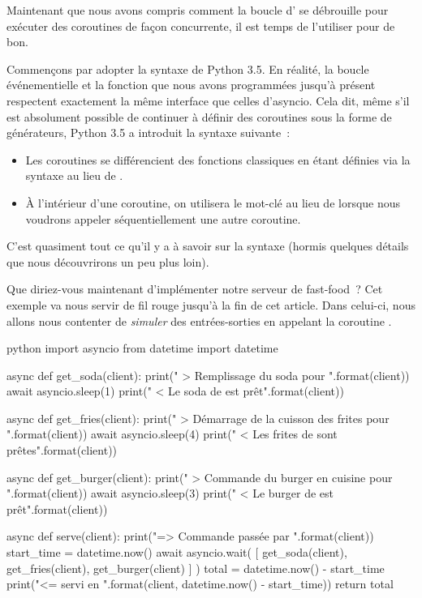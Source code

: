 \documentclass[small]{zmdocument}
\begin{document}

Maintenant que nous avons compris comment la boucle d' se débrouille pour exécuter des coroutines de façon concurrente, il est temps de l’utiliser pour de bon.



Commençons par adopter la syntaxe de Python 3.5. En réalité, la boucle événementielle et la fonction  que nous avons programmées jusqu’à présent respectent exactement la même interface que celles d’asyncio. Cela dit, même s’il est absolument possible de continuer à définir des coroutines sous la forme de générateurs, Python 3.5 a introduit la syntaxe suivante :



\begin{itemize}
\item\relax Les coroutines se différencient des fonctions classiques en étant définies via la syntaxe  au lieu de .
\item\relax À l’intérieur d’une coroutine, on utilisera le mot-clé  au lieu de  lorsque nous voudrons appeler séquentiellement une autre coroutine.
\end{itemize}


C’est quasiment tout ce qu’il y a à savoir sur la syntaxe (hormis quelques détails que nous découvrirons un peu plus loin).



Que diriez-vous maintenant d’implémenter notre serveur de fast-food ? Cet exemple va nous servir de fil rouge jusqu’à la fin de cet article. Dans celui-ci, nous allons nous contenter de \textit{simuler} des entrées-sorties en appelant la coroutine .



\begin{CodeBlock}{python}
import asyncio
from datetime import datetime


async def get_soda(client):
    print("    > Remplissage du soda pour {}".format(client))
    await asyncio.sleep(1)
    print("    < Le soda de {} est prêt".format(client))

async def get_fries(client):
    print("    > Démarrage de la cuisson des frites pour {}".format(client))
    await asyncio.sleep(4)
    print("    < Les frites de {} sont prêtes".format(client))

async def get_burger(client):
    print("    > Commande du burger en cuisine pour {}".format(client))
    await asyncio.sleep(3)
    print("    < Le burger de {} est prêt".format(client))

async def serve(client):
    print("=> Commande passée par {}".format(client))
    start_time = datetime.now()
    await asyncio.wait(
        [
            get_soda(client),
            get_fries(client),
            get_burger(client)
        ]
    )
    total = datetime.now() - start_time
    print("<= {} servi en {}".format(client, datetime.now() - start_time))
    return total
\end{CodeBlock}
\end{document}
